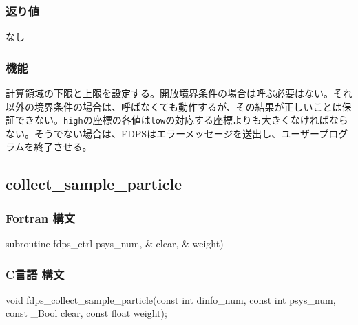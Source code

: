 \subsubsection*{返り値}
なし

\subsubsection*{機能}
計算領域の下限と上限を設定する。開放境界条件の場合は呼ぶ必要はない。それ以外の境界条件の場合は、呼ばなくても動作するが、その結果が正しいことは保証できない。\texttt{high}の座標の各値は\texttt{low}の対応する座標よりも大きくなければならない。そうでない場合は、FDPSはエラーメッセージを送出し、ユーザープログラムを終了させる。
\clearpage

\subsection{collect\_sample\_particle}
\subsubsection*{Fortran 構文}
\begin{screen}
\begin{spverbatim}
subroutine fdps_ctrl%
                                             psys_num,  &
                                             clear,     &
                                             weight)
\end{spverbatim}
\end{screen}

\subsubsection*{C言語 構文}
\begin{screen}
\begin{spverbatim}
void fdps_collect_sample_particle(const int dinfo_num,
                                  const int psys_num,
                                  const _Bool clear,
                                  const float weight);
\end{spverbatim}
\end{screen}

\clearpage

